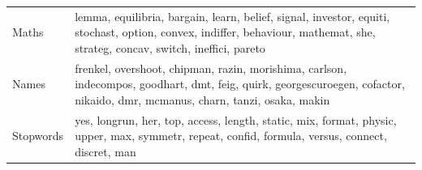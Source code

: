 \begin{table}[tb]
\begin{tabularx}{\hsize}{lY}
Maths & lemma, equilibria, bargain, learn, belief, signal, investor, equiti, stochast, option, convex, indiffer, behaviour, mathemat, she, strateg, concav, switch, ineffici, pareto \\
Names & frenkel, overshoot, chipman, razin, morishima, carlson, indecompos, goodhart, dmt, feig, quirk, georgescuroegen, cofactor, nikaido, dmr, mcmanus, charn, tanzi, osaka, makin \\
Stopwords & yes, longrun, her, top, access, length, static, mix, format, physic, upper, max, symmetr, repeat, confid, formula, versus, connect, discret, man \\
\bottomrule
\end{tabularx}
\end{table}
